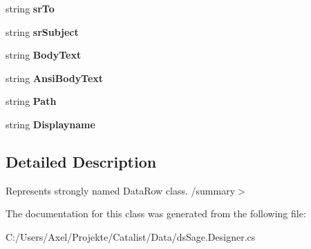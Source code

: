 \begin{DoxyCompactItemize}
\item 
string {\bfseries sr\+To}\hypertarget{class_products_1_1_data_1_1ds_sage_1_1_david_item_row_a738df4cf7d9b7085359f85f056bde648}{}\label{class_products_1_1_data_1_1ds_sage_1_1_david_item_row_a738df4cf7d9b7085359f85f056bde648}

\item 
string {\bfseries sr\+Subject}\hypertarget{class_products_1_1_data_1_1ds_sage_1_1_david_item_row_aff425b1484afd5e2267237c71a908cd9}{}\label{class_products_1_1_data_1_1ds_sage_1_1_david_item_row_aff425b1484afd5e2267237c71a908cd9}

\item 
string {\bfseries Body\+Text}\hypertarget{class_products_1_1_data_1_1ds_sage_1_1_david_item_row_ac7877af2e4eaff88fa838cd89f2f397a}{}\label{class_products_1_1_data_1_1ds_sage_1_1_david_item_row_ac7877af2e4eaff88fa838cd89f2f397a}

\item 
string {\bfseries Ansi\+Body\+Text}\hypertarget{class_products_1_1_data_1_1ds_sage_1_1_david_item_row_a9d41e99f7974b018493283d875d89f4e}{}\label{class_products_1_1_data_1_1ds_sage_1_1_david_item_row_a9d41e99f7974b018493283d875d89f4e}

\item 
string {\bfseries Path}\hypertarget{class_products_1_1_data_1_1ds_sage_1_1_david_item_row_a0d25da179f39e71aecf4309c60386f41}{}\label{class_products_1_1_data_1_1ds_sage_1_1_david_item_row_a0d25da179f39e71aecf4309c60386f41}

\item 
string {\bfseries Displayname}\hypertarget{class_products_1_1_data_1_1ds_sage_1_1_david_item_row_a8781735c06378a06263c952dc1a96330}{}\label{class_products_1_1_data_1_1ds_sage_1_1_david_item_row_a8781735c06378a06263c952dc1a96330}

\end{DoxyCompactItemize}


\subsection{Detailed Description}
Represents strongly named Data\+Row class. /summary$>$ 

The documentation for this class was generated from the following file\+:\begin{DoxyCompactItemize}
\item 
C\+:/\+Users/\+Axel/\+Projekte/\+Catalist/\+Data/ds\+Sage.\+Designer.\+cs\end{DoxyCompactItemize}
